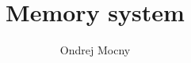 \documentclass[12pt, a4paper]{article}
\begin{document}
\title{Memory system}
\author{Ondrej Mocny}
\maketitle

\tableofcontents

\newpage


\end{document}
